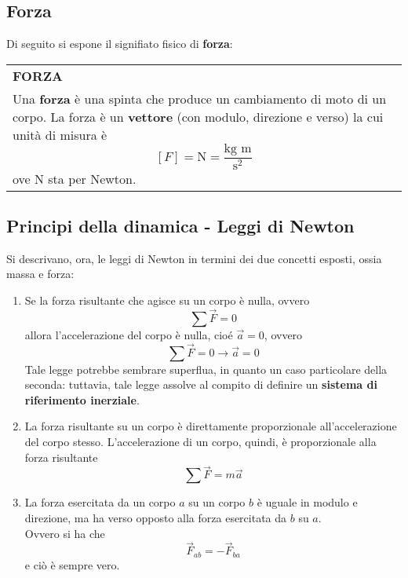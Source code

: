 \documentclass[a4paper]{extarticle}
\renewcommand\arraystretch{}
\begin{document}
\newpage
\noindent
\subsection{Forza}
Di seguito si espone il signifiato fisico di \textbf{forza}:

\vspace{1em}
\setlength{\tabcolsep}{14pt}
\renewcommand{\arraystretch}{2}
\noindent
\begin{tabularx}{\textwidth}{@{}|P|@{}}
    \hline
    {\textbf{FORZA}}\\
    \parbox{\linewidth}{Una \textbf{forza} è una spinta che produce un cambiamento di moto di un corpo.\\
    La forza è un \textbf{vettore} (con modulo, direzione e verso) la cui unità di misura è
    \[[F] = \text{N} = \frac{\text{kg m}}{\text{s}^2}\]
    ove N sta per Newton.
    \vspace{3mm}}\\
    \hline
\end{tabularx}

\vspace{1em}
\subsection{Principi della dinamica - Leggi di Newton}
Si descrivano, ora, le leggi di Newton in termini dei due concetti esposti, ossia massa e forza:

\begin{enumerate}
  \item Se la forza risultante che agisce su un corpo è nulla, ovvero
  \[\sum \vec{F} = 0\]
  allora l'accelerazione del corpo è nulla, cioé $\vec{a}=0$, ovvero
  \[\boxed{\sum \vec{F} = 0 \longrightarrow \vec{a}=0}\]
  Tale legge potrebbe sembrare superflua, in quanto un caso particolare della seconda: tuttavia, tale legge assolve al compito di definire un \textbf{sistema di riferimento inerziale}.

  \item La forza risultante su un corpo è direttamente proporzionale all'accelerazione del corpo stesso. L'accelerazione di un corpo, quindi, è proporzionale alla forza risultante
  \[\boxed{\sum \vec{F} = m \vec{a}}\]

  \item La forza esercitata da un corpo $a$ su un corpo $b$ è uguale in modulo e direzione, ma ha verso opposto alla forza esercitata da $b$ su $a$.\\
  Ovvero si ha che
  \[\boxed{\vec{F}_{ab} = -\vec{F}_{ba}}\]
  e ciò è sempre vero.
\end{enumerate}
\end{document}
